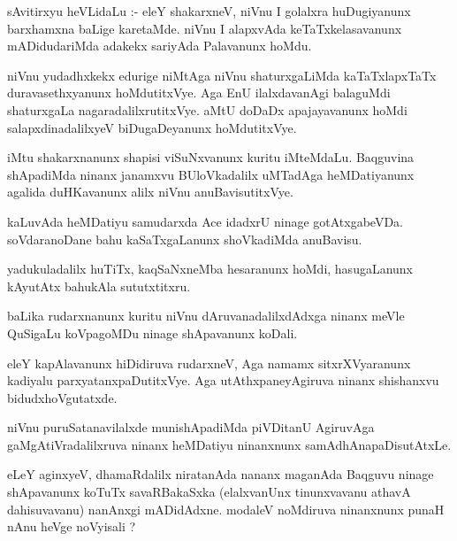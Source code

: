 \documentclass{article}
\begin{document}
\begin{mn}
sAvitirxyu heVLidaLu :- eleY shakarxneV, niVnu I golalxra huDugiyanunx  barxhamxna baLige karetaMde.  
niVnu I alapxvAda keTaTxkelasavanunx mADidudariMda adakekx sariyAda Palavanunx hoMdu.
\end{mn}

\begin{mn}
niVnu yudadhxkekx edurige niMtAga  niVnu shaturxgaLiMda  kaTaTxlapxTaTx  duravasethxyanunx  
hoMdutitxVye.  Aga  EnU  ilalxdavanAgi  balaguMdi shaturxgaLa nagaradalilxrutitxVye.  
aMtU  doDaDx apajayavanunx hoMdi salapxdinadalilxyeV biDugaDeyanunx  hoMdutitxVye.
\end{mn}

\begin{mn}
iMtu shakarxnanunx shapisi  viSuNxvanunx  kuritu  iMteMdaLu. Baqguvina  shApadiMda ninanx 
janamxvu  BUloVkadalilx uMTadAga heMDatiyanunx  agalida duHKavanunx alilx niVnu anuBavisutitxVye.
\end{mn}

\begin{mn}
kaLuvAda heMDatiyu samudarxda Ace idadxrU ninage gotAtxgabeVDa.  soVdaranoDane bahu  kaSaTxgaLanunx  shoVkadiMda anuBavisu.
\end{mn}

\begin{mn}
yadukuladalilx huTiTx,  kaqSaNxneMba  hesaranunx  hoMdi,  hasugaLanunx  kAyutAtx bahukAla sututxtitxru.
\end{mn}

\begin{mn}
baLika  rudarxnanunx kuritu  niVnu dAruvanadalilxdAdxga  ninanx meVle QuSigaLu  koVpagoMDu ninage  shApavanunx  koDali.
\end{mn}

\begin{mn}
eleY kapAlavanunx hiDidiruva  rudarxneV,  Aga namamx  sitxrXVyaranunx kadiyalu 
parxyatanxpaDutitxVye.  Aga utAthxpaneyAgiruva  ninanx shishanxvu  bidudxhoVgutatxde.
\end{mn}

\begin{mn}
niVnu puruSatanavilalxde munishApadiMda piVDitanU AgiruvAga  gaMgAtiVradalilxruva  
ninanx heMDatiyu  ninanxnunx  samAdhAnapaDisutAtxLe.
\end{mn}

\begin{mn}
eLeY aginxyeV,  dhamaRdalilx niratanAda nananx maganAda Baqguvu ninage  shApavanunx  
koTuTx  savaRBakaSxka (elalxvanUnx tinunxvavanu athavA dahisuvavanu) 
nanAnxgi mADidAdxne.  modaleV  noMdiruva  ninanxnunx punaH nAnu heVge noVyisali ?
\end{mn}
\end{document}
